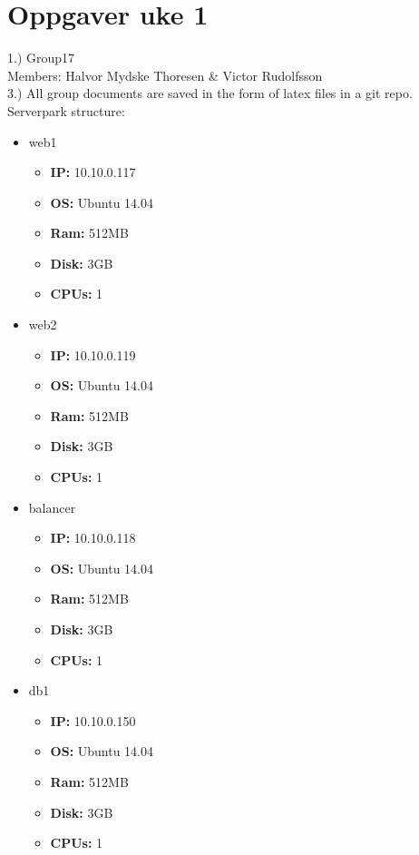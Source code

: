 \section{Oppgaver uke 1}

1.) Group17\\
	 Members: Halvor Mydske Thoresen \& Victor Rudolfsson\\
3.) All group documents are saved in the form of latex files in a git repo. \\
Serverpark structure: 
\small
\begin{itemize}
	\item web1
		\begin{itemize}
			\item \textbf{IP:} 10.10.0.117
			\item \textbf{OS:} Ubuntu 14.04
			\item \textbf{Ram:} 512MB
			\item \textbf{Disk:} 3GB
			\item \textbf{CPUs:} 1
		\end{itemize}
	\item web2
		\begin{itemize}
			\item \textbf{IP:} 10.10.0.119
			\item \textbf{OS:} Ubuntu 14.04
			\item \textbf{Ram:} 512MB
			\item \textbf{Disk:} 3GB
			\item \textbf{CPUs:} 1
		\end{itemize}
	\item balancer
		\begin{itemize}
			\item \textbf{IP:} 10.10.0.118
			\item \textbf{OS:} Ubuntu 14.04
			\item \textbf{Ram:} 512MB
			\item \textbf{Disk:} 3GB
			\item \textbf{CPUs:} 1
		\end{itemize}
	\item db1
		\begin{itemize}
			\item \textbf{IP:} 10.10.0.150
			\item \textbf{OS:} Ubuntu 14.04
			\item \textbf{Ram:} 512MB
			\item \textbf{Disk:} 3GB
			\item \textbf{CPUs:} 1
		\end{itemize}
\end{itemize}

